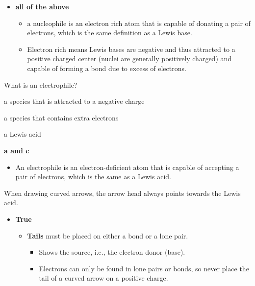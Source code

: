 \documentclass[12pt,a4paper]{article}
\begin{document}
\begin{enumerate}
        \begin{itemize}
            \item {\color{o-Sun}\textbf{all of the above}}
                \begin{itemize}
                    \item a nucleophile is an electron rich atom that is capable of {\color{o-Sun}donating a pair of electrons}, which is the same definition as a {\color{neg}Lewis base}.
                    \item Electron {\color{o-Sun}rich} means {\color{neg}Lewis bases are negative} and thus attracted to a {\color{pos}positive charged} center (nuclei are generally positively charged) and capable of forming a bond due to excess of electrons. 
                \end{itemize}
        \end{itemize}
    {\color{G-Moon}\item What is an electrophile?}
        \begin{itemize}
        {\color{G-Moon}\item[a.] a species that is attracted to a negative charge
            \item[b.] a species that contains extra electrons 
            \item[c.] a Lewis acid}
            {\color{o-Sun}\item[d.] \textbf{a and c}}
            \begin{itemize}
                \item An electrophile is an {\color{o-Sun}electron-deficient} atom that is capable of {\color{o-Sun}accepting a pair of electrons}, which is the same as a {\color{pos}Lewis acid}.
            \end{itemize}
        \end{itemize}
    \newpage
    {\color{G-Moon}\item When drawing curved arrows, the arrow head always points towards the Lewis acid.}
        \begin{itemize}
            \item {\color{o-Sun}\textbf{True}}
            \begin{itemize}
                \item \textbf{Tails} must be placed on either a bond or a lone pair.
                    \begin{itemize}
                        \item Shows the {\color{o-Sun}source}, i.e., the electron donor (base).
                        \item Electrons can only be found in lone pairs or bonds, so {\color{o-Sun}never place the tail} of a curved arrow on a {\color{pos}positive charge}.

\end{itemize}
\end{itemize}
\end{itemize}
\end{enumerate}
\end{document}
